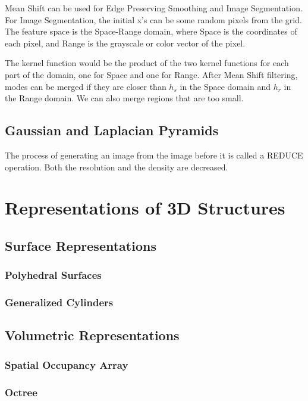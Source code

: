 \documentclass{article}
\begin{document}
\begin{multicols}{2}
\vspace{2mm}

Mean Shift can be used for Edge Preserving Smoothing and Image Segmentation. For Image Segmentation, the initial x's can be some random pixels from the grid. The feature space is the Space-Range domain, where Space is the coordinates of each pixel, and Range is the grayscale or color vector of the pixel.

\vspace{2mm}

The kernel function would be the product of the two kernel functions for each part of the domain, one for Space and one for Range. After Mean Shift filtering, modes can be merged if they are closer than $h_s$ in the Space domain and $h_r$ in the Range domain. We can also merge regions that are too small.

\subsection{Gaussian and Laplacian Pyramids}

The process of generating an image from the image before it is called a REDUCE operation. Both the resolution and the density are decreased.

\section{Representations of 3D Structures}
\subsection{Surface Representations}
\subsubsection{Polyhedral Surfaces}
\subsubsection{Generalized Cylinders}
\subsection{Volumetric Representations}
\subsubsection{Spatial Occupancy Array}
\subsubsection{Octree}

\end{multicols}
\end{document}
